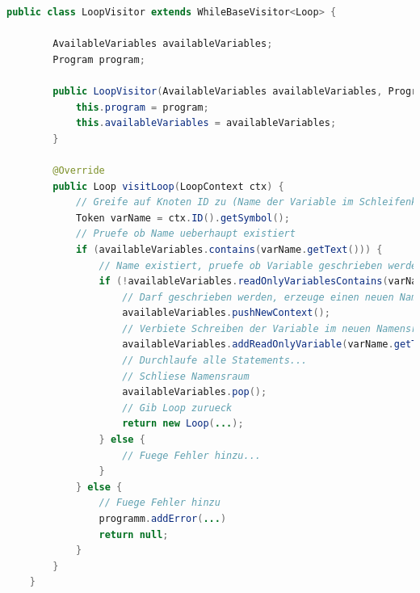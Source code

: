 \begin{lstlisting}[language=java, caption=Umgang mit Namensräumen, label={lst:semantic-scope-loop}]
	public class LoopVisitor extends WhileBaseVisitor<Loop> {
		
		AvailableVariables availableVariables;
		Program program;
		
		public LoopVisitor(AvailableVariables availableVariables, Program program) {
			this.program = program;
			this.availableVariables = availableVariables;
		}
		
		@Override
		public Loop visitLoop(LoopContext ctx) {
			// Greife auf Knoten ID zu (Name der Variable im Schleifenkopf)
			Token varName = ctx.ID().getSymbol();
			// Pruefe ob Name ueberhaupt existiert
			if (availableVariables.contains(varName.getText())) {
				// Name existiert, pruefe ob Variable geschrieben werden darf
				if (!availableVariables.readOnlyVariablesContains(varName.getText())) {
					// Darf geschrieben werden, erzeuge einen neuen Namensraum
					availableVariables.pushNewContext();
					// Verbiete Schreiben der Variable im neuen Namensraum
					availableVariables.addReadOnlyVariable(varName.getText());
					// Durchlaufe alle Statements...
					// Schliese Namensraum
					availableVariables.pop();
					// Gib Loop zurueck
					return new Loop(...);
				} else {
					// Fuege Fehler hinzu...
				}
			} else {
				// Fuege Fehler hinzu 
				programm.addError(...)
				return null;
			}
		}
	}
\end{lstlisting}
